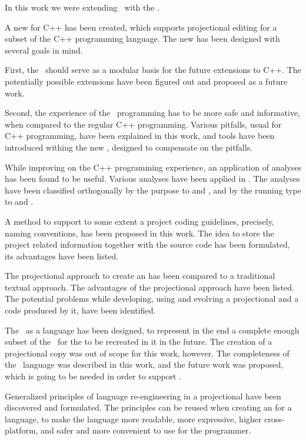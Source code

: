 
In this work we were extending \mbdr\ with the \cpppl. 

A new  for C++ has been created, which supports projectional editing for 
a subset of the C++ programming language. The new  has been designed with several goals 
in mind.

First, the \pcpp\ should serve as a modular basis for the future extensions to C++. The 
potentially possible extensions have been figured out and proposed as a future 
work.

Second, the experience of the \pcpp\ programming has to be more safe and informative,
when compared to the regular C++ programming. Various pitfalls, usual for C++ programming,
have been explained in this work, and tools have been introduced withing the new ,
designed to compensate on the pitfalls.

While improving on the C++ programming experience, an application of analyses has been
found to be useful. Various analyses have been applied in \pcpp. The analyses have been
classified orthogonally by the purpose to  and ,
and by the running type to  and .


A method to support to some extent a project coding guidelines, precisely, naming conventions,
has been proposed in this work. The idea to store the project related information together 
with the source code has been formulated, its advantages have been listed.

The projectional approach to create an  has been compared to a traditional textual approach.
The advantages of the projectional approach have been listed. The potential problems while developing,
using and evolving a projectional  and a code produced by it, have been identified.

The \pcpp\ as a language has been designed, to represent in the end a complete enough subset 
of the \cpppl\ for the  to be recreated in it in the future. The creation of a 
projectional  copy was out of scope for this work, however.
The completeness of the \pcpp\ language was described in this work, and
the future work was proposed, which is going to be needed in order to support .


Generalized principles of language re-engineering in a projectional  have been
discovered and formulated. The principles can be reused when creating an  for 
a language, to make the language more readable, more expressive, higher cross-platform,
and safer and more convenient to use for the programmer. 

